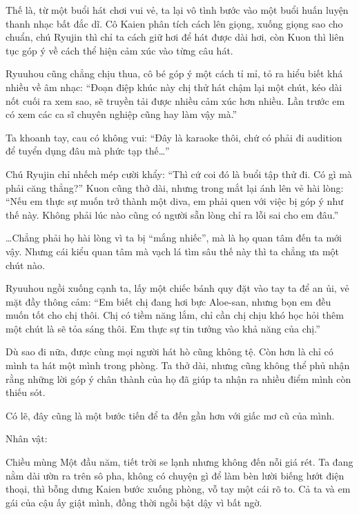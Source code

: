 \documentclass[../main.tex]{subfiles}
\begin{document}
Thế là, từ một buổi hát chơi vui vẻ, ta lại vô tình bước vào một buổi huấn luyện thanh nhạc bất đắc dĩ. Cô Kaien phân tích cách lên giọng, xuống giọng sao cho chuẩn, chú Ryujin thì chỉ ta cách giữ hơi để hát được dài hơi, còn Kuon thì liên tục góp ý về cách thể hiện cảm xúc vào từng câu hát.

Ryuuhou cũng chẳng chịu thua, cô bé góp ý một cách tỉ mỉ, tỏ ra hiểu biết khá nhiều về âm nhạc: ``Đoạn điệp khúc này chị thử hát chậm lại một chút, kéo dài nốt cuối ra xem sao, sẽ truyền tải được nhiều cảm xúc hơn nhiều. Lần trước em có xem các ca sĩ chuyên nghiệp cũng hay làm vậy mà.''

Ta khoanh tay, cau có không vui: ``Đây là karaoke thôi, chứ có phải đi audition để tuyển dụng đâu mà phức tạp thế\dots''

Chú Ryujin chỉ nhếch mép cười khẩy: ``Thì cứ coi đó là buổi tập thử đi. Có gì mà phải căng thẳng?'' Kuon cũng thở dài, nhưng trong mắt lại ánh lên vẻ hài lòng: ``Nếu em thực sự muốn trở thành một diva, em phải quen với việc bị góp ý như thế này. Không phải lúc nào cũng có người sẵn lòng chỉ ra lỗi sai cho em đâu.''

\dots Chẳng phải họ hài lòng vì ta bị ``mắng nhiếc'', mà là họ quan tâm đến ta mới vậy. Nhưng cái kiểu quan tâm mà vạch lá tìm sâu thế này thì ta chẳng ưa một chút nào.

Ryuuhou ngồi xuống cạnh ta, lấy một chiếc bánh quy đặt vào tay ta để an ủi, vẻ mặt đầy thông cảm: ``Em biết chị đang hơi bực Aloe-san, nhưng bọn em đều muốn tốt cho chị thôi. Chị có tiềm năng lắm, chỉ cần chị chịu khó học hỏi thêm một chút là sẽ tỏa sáng thôi. Em thực sự tin tưởng vào khả năng của chị.''

Dù sao đi nữa, được cùng mọi người hát hò cũng không tệ. Còn hơn là chỉ có mình ta hát một mình trong phòng. Ta thở dài, nhưng cũng không thể phủ nhận rằng những lời góp ý chân thành của họ đã giúp ta nhận ra nhiều điểm mình còn thiếu sót.

Có lẽ, đây cũng là một bước tiến để ta đến gần hơn với giấc mơ cũ của mình.

\begin{center}
{\caviar\fontsize{12pt}{12pt}\selectfont Nhân vật:   }
\end{center}

Chiều mùng Một đầu năm, tiết trời se lạnh nhưng không đến nỗi giá rét. Ta đang nằm dài ườn ra trên sô pha, không có chuyện gì để làm bèn lười biếng lướt điện thoại, thì bỗng dưng Kaien bước xuống phòng, vỗ tay một cái rõ to. Cả ta và em gái của cậu ấy giật mình, đồng thời ngồi bật dậy vì bất ngờ.
\end{document}
